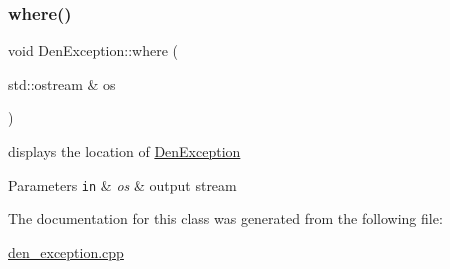 \subsubsection{\texorpdfstring{where()}{where()}}
{\footnotesize\ttfamily void Den\+Exception\+::where (\begin{DoxyParamCaption}\item[{std\+::ostream \&}]{os }\end{DoxyParamCaption})}



displays the location of \hyperlink{classDenException}{Den\+Exception} 


\begin{DoxyParams}[1]{Parameters}
\mbox{\tt in}  & {\em os} & output stream \\
\hline
\end{DoxyParams}


The documentation for this class was generated from the following file\+:\begin{DoxyCompactItemize}
\item 
\hyperlink{den__exception_8cpp}{den\+\_\+exception.\+cpp}\end{DoxyCompactItemize}
